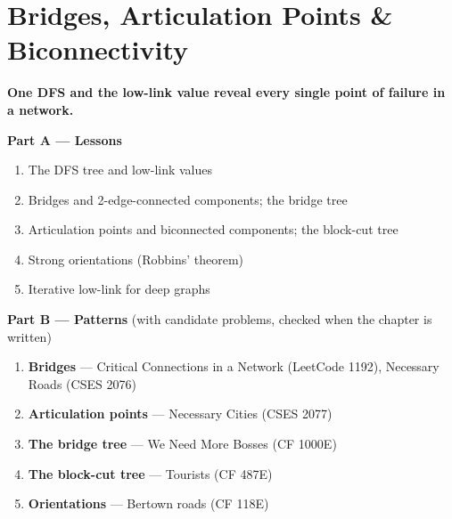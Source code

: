\chapter{Bridges, Articulation Points \& Biconnectivity}
\label{ch:bridges}

\begin{tcolorbox}[enhanced, colback=white, colframe=secondaryblue, boxrule=1pt, arc=2mm]
\textbf{\large\textcolor{primaryblue}{One DFS and the low-link value reveal every single point of failure in a network.}}
\end{tcolorbox}


\begin{plannedbox}
\textbf{Part A --- Lessons}
\begin{enumerate}[leftmargin=*, label=\textbf{A\arabic*.}, itemsep=1pt]
    \item The DFS tree and low-link values
    \item Bridges and 2-edge-connected components; the bridge tree
    \item Articulation points and biconnected components; the block-cut tree
    \item Strong orientations (Robbins' theorem)
    \item Iterative low-link for deep graphs
\end{enumerate}
\textbf{Part B --- Patterns} (with candidate problems, checked when the chapter is written)
\begin{enumerate}[leftmargin=*, label=\textbf{P\arabic*.}, itemsep=1pt]
    \item \textbf{Bridges} --- Critical Connections in a Network {\small\color{darkgray}(LeetCode 1192)}, Necessary Roads {\small\color{darkgray}(CSES 2076)}
    \item \textbf{Articulation points} --- Necessary Cities {\small\color{darkgray}(CSES 2077)}
    \item \textbf{The bridge tree} --- We Need More Bosses {\small\color{darkgray}(CF 1000E)}
    \item \textbf{The block-cut tree} --- Tourists {\small\color{darkgray}(CF 487E)}
    \item \textbf{Orientations} --- Bertown roads {\small\color{darkgray}(CF 118E)}
\end{enumerate}
\end{plannedbox}
